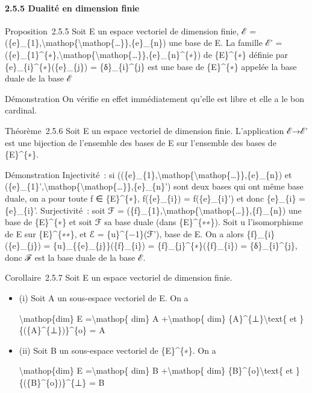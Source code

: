 \documentclass[]{article}
\begin{document}
\paragraph{2.5.5 Dualité en dimension finie}

Proposition~2.5.5 Soit E un espace vectoriel de dimension finie, ℰ =
(\{e\}\_\{1\},\textbackslash{}mathop\{\textbackslash{}mathop\{\ldots{}\}\},\{e\}\_\{n\})
une base de E. La famille ℰ' =
(\{e\}\_\{1\}\^{}\{∗\},\textbackslash{}mathop\{\textbackslash{}mathop\{\ldots{}\}\},\{e\}\_\{n\}\^{}\{∗\})
de \{E\}\^{}\{∗\} définie par \{e\}\_\{i\}\^{}\{∗\}(\{e\}\_\{j\}) =
\{δ\}\_\{i\}\^{}\{j\} est une base de \{E\}\^{}\{∗\} appelée la base
duale de la base ℰ

Démonstration On vérifie en effet immédiatement qu'elle est libre et
elle a le bon cardinal.

Théorème~2.5.6 Soit E un espace vectoriel de dimension finie.
L'application ℰ→ℰ' est une bijection de l'ensemble des bases de E sur
l'ensemble des bases de \{E\}\^{}\{∗\}.

Démonstration Injectivité~: si
((\{e\}\_\{1\},\textbackslash{}mathop\{\textbackslash{}mathop\{\ldots{}\}\},\{e\}\_\{n\})
et
(\{e\}\_\{1\}',\textbackslash{}mathop\{\textbackslash{}mathop\{\ldots{}\}\},\{e\}\_\{n\}')
sont deux bases qui ont même base duale, on a pour toute f ∈
\{E\}\^{}\{∗\}, f(\{e\}\_\{i\}) = f(\{e\}\_\{i\}') et donc \{e\}\_\{i\}
= \{e\}\_\{i\}'. Surjectivité~: soit ℱ =
(\{f\}\_\{1\},\textbackslash{}mathop\{\textbackslash{}mathop\{\ldots{}\}\},\{f\}\_\{n\})
une base de \{E\}\^{}\{∗\} et soit ℱ sa base duale (dans
\{E\}\^{}\{∗∗\}). Soit u l'isomorphisme de E sur \{E\}\^{}\{∗∗\}, et ℰ =
\{u\}\^{}\{−1\}(ℱ'), base de E. On a alors \{f\}\_\{i\}(\{e\}\_\{j\}) =
\{u\}\_\{\{e\}\_\{j\}\}(\{f\}\_\{i\}) =
\{f\}\_\{j\}\^{}\{∗\}(\{f\}\_\{i\}) = \{δ\}\_\{i\}\^{}\{j\}, donc ℱ est
la base duale de la base ℰ.

Corollaire~2.5.7 Soit E un espace vectoriel de dimension finie.

\begin{itemize}
\item
  (i) Soit A un sous-espace vectoriel de E. On a

  \textbackslash{}mathop\{dim\} E =\textbackslash{}mathop\{ dim\} A
  +\textbackslash{}mathop\{ dim\} \{A\}\^{}\{⊥\}\textbackslash{}text\{
  et \}\{(\{A\}\^{}\{⊥\})\}\^{}\{o\} = A
\item
  (ii) Soit B un sous-espace vectoriel de \{E\}\^{}\{∗\}. On a

  \textbackslash{}mathop\{dim\} E =\textbackslash{}mathop\{ dim\} B
  +\textbackslash{}mathop\{ dim\} \{B\}\^{}\{o\}\textbackslash{}text\{
  et \}\{(\{B\}\^{}\{o\})\}\^{}\{⊥\} = B
\end{itemize}
\end{document}
